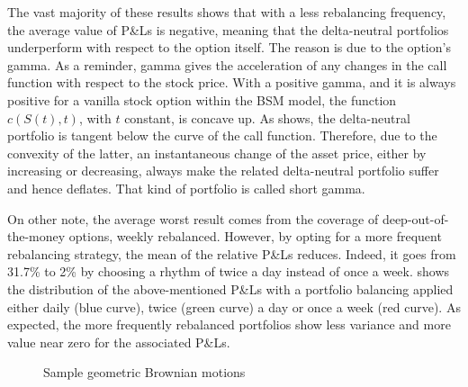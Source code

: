 \documentclass[12pt]{report}
\begin{document}
The vast majority of these results shows that with a less rebalancing frequency, the average value of P\&Ls is negative, meaning that the delta-neutral portfolios underperform with respect to the option itself. 
The reason is due to the option's gamma. 
As a reminder, gamma gives the acceleration of any changes in the call function with respect to the stock price.
With a positive gamma, and it is always positive for a vanilla stock option within the BSM model, the function $c(S(t), t)$, with $t$  constant, is concave up. 
As \citet{shreve} shows, the delta-neutral portfolio is tangent below the curve of the call function.
Therefore, due to the convexity of the latter, an instantaneous change of the asset price, either by increasing or decreasing, always make the related delta-neutral portfolio suffer and hence deflates. 
That kind of portfolio is called short gamma.

















On other note, the average worst result comes from the coverage of deep-out-of-the-money options, weekly rebalanced.
However, by opting for a more frequent rebalancing strategy, the mean of the relative P\&Ls reduces.  
Indeed, it goes from 31.7\% to 2\% by choosing a rhythm of twice a day instead of once a week.
 shows the distribution of the above-mentioned P\&Ls with a portfolio balancing applied either daily (blue curve), twice (green curve) a day or once a week (red curve).
As expected, the more frequently rebalanced portfolios show less variance and more value near zero for the associated P\&Ls.

\begin{figure}[h]
  \centering
  
  \caption{Sample geometric Brownian motions}
  \label{p:analysis:gbm:pl:better}
\end{figure}
\end{document}
